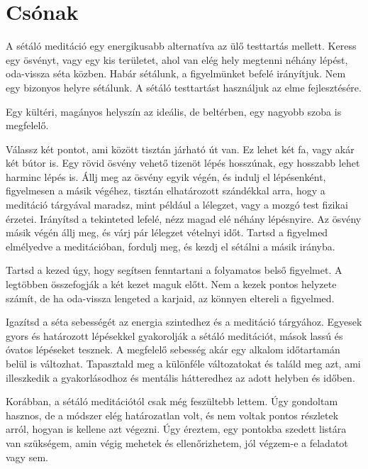\chapter{Csónak}


\noindent A sétáló meditáció egy energikusabb alternatíva az ülő
testtartás mellett. Keress egy ösvényt, vagy egy kis területet, ahol van
elég hely megtenni néhány lépést, oda-vissza séta közben. Habár
sétálunk, a figyelmünket befelé irányítjuk. Nem egy bizonyos helyre
sétálunk. A sétáló testtartást használjuk az elme fejlesztésére.

Egy kültéri, magányos helyszín az ideális, de beltérben, egy nagyobb
szoba is megfelelő.

Válassz két pontot, ami között tisztán járható út van. Ez lehet két fa,
vagy akár két bútor is. Egy rövid ösvény vehető tizenöt lépés hosszúnak,
egy hosszabb lehet harminc lépés is. Állj meg az ösvény egyik végén, és
indulj el lépésenként, figyelmesen a másik végéhez, tisztán elhatározott
szándékkal arra, hogy a meditáció tárgyával maradsz, mint például a
lélegzet, vagy a mozgó test fizikai érzetei. Irányítsd a tekinteted
lefelé, nézz magad elé néhány lépésnyire. Az ösvény másik végén állj
meg, és várj pár lélegzet vételnyi időt. Tartsd a figyelmed elmélyedve a
meditációban, fordulj meg, és kezdj el sétálni a másik irányba.

Tartsd a kezed úgy, hogy segítsen fenntartani a folyamatos belső
figyelmet. A legtöbben összefogják a két kezet maguk előtt. Nem a kezek
pontos helyzete számít, de ha oda-vissza lengeted a karjaid, az könnyen
eltereli a figyelmed.

\clearpage
\thispagestyle{empty}\mbox{}
\clearpage

Igazítsd a séta sebességét az energia szintedhez és a meditáció
tárgyához. Egyesek gyors és határozott lépésekkel gyakorolják a sétáló
meditációt, mások lassú és óvatos lépéseket tesznek. A megfelelő
sebesség akár egy alkalom időtartamán belül is változhat. Tapasztald meg
a különféle változatokat és találd meg azt, ami illeszkedik a
gyakorlásodhoz és mentális hátteredhez az adott helyben és időben.


Korábban, a sétáló meditációtól csak még feszültebb lettem. Úgy
gondoltam hasznos, de a módszer elég határozatlan volt, és nem voltak
pontos részletek arról, hogyan is kellene azt végezni. Úgy éreztem, egy
pontokba szedett listára van szükségem, amin végig mehetek és
ellenőrizhetem, jól végzem-e a feladatot vagy sem.

